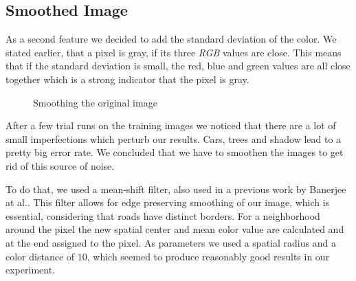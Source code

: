 \documentclass[10pt,conference,compsocconf]{IEEEtran}
\begin{document}
\subsection{Smoothed Image}

As a second feature we decided to add the standard deviation of the color. We stated earlier, that a pixel is gray, if its three \emph{RGB} values are close. This means that if the standard deviation is small, the red, blue and green values are all close together which is a strong indicator that the pixel is gray.

\begin{figure}[t]
	\centering
	\hspace{0.025\linewidth}
	\caption{Smoothing the original image}
\end{figure}

After a few trial runs on the training images we noticed that there are a lot of small imperfections which perturb our results. Cars, trees and shadow lead to a pretty big error rate. We concluded that we have to smoothen the images to get rid of this source of noise.

To do that, we used a mean-shift filter, also used in a previous work by Banerjee at al.\cite{BaBuMo12}. This filter allows for edge preserving smoothing of our image, which is essential, considering that roads have distinct borders. For a neighborhood around the pixel the new spatial center and mean color value are calculated and at the end assigned to the pixel. As parameters we used a spatial radius and a color distance of $10$, which seemed to produce reasonably good results in our experiment.
\end{document}
